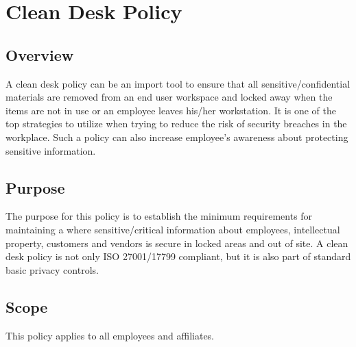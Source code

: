 \chapter{Clean Desk Policy}
\CommonIntroduction
\section{Overview}
A clean desk policy can be an import tool to ensure that all sensitive/confidential materials are removed from an end user workspace and locked away when the items are not in use or an employee leaves his/her workstation.  
It is one of the top strategies to utilize when trying to reduce the risk of security breaches in the workplace.  
Such a policy can also increase employee’s awareness about protecting sensitive information.
\section{Purpose}
The purpose for this policy is to establish the minimum requirements for maintaining a  where sensitive/critical information about employees, intellectual property, customers\oxford{} and vendors is secure in locked areas and out of site.  
A clean desk policy is not only ISO 27001/17799 compliant, but it is also part of standard basic privacy controls.
\section{Scope}
This policy applies to all \CompanyName{} employees and affiliates.

